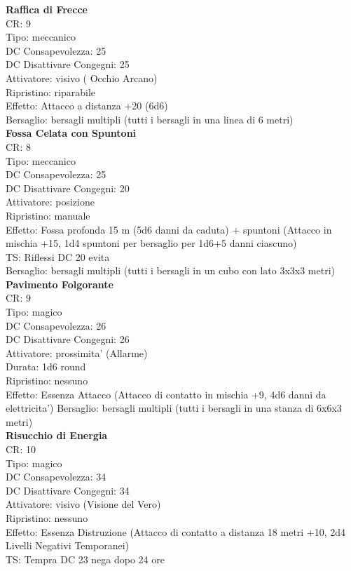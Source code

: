 \documentclass[a4paper,11pt,twoside,openany]{book}
\begin{document}
{\begin{multicols}{2}
			\textbf{Raffica di Frecce}\\
			CR: 9 \\
			Tipo: meccanico \\
			DC Consapevolezza: 25 \\
			DC Disattivare Congegni: 25 \\
			Attivatore: visivo ( Occhio Arcano) \\
			Ripristino: riparabile \\
			Effetto: Attacco a distanza +20 (6d6) \\
			Bersaglio: bersagli multipli (tutti i bersagli in una linea di 6 metri)\\
			
			\textbf{Fossa Celata con Spuntoni}\\
			CR: 8 \\
			Tipo: meccanico \\
			DC Consapevolezza: 25 \\
			DC Disattivare Congegni: 20 \\
			Attivatore: posizione \\
			Ripristino: manuale \\
			Effetto: Fossa profonda 15 m (5d6 danni da caduta) + spuntoni (Attacco in mischia +15, 1d4 spuntoni per bersaglio per 1d6+5 danni ciascuno) \\
			TS: Riflessi DC 20 evita \\
			Bersaglio: bersagli multipli (tutti i bersagli in un cubo con lato 3x3x3 metri)\\
			
			\textbf{Pavimento Folgorante}\\
			CR: 9 \\
			Tipo: magico \\
			DC Consapevolezza: 26 \\
			DC Disattivare Congegni: 26 \\
			Attivatore: prossimita' (Allarme) \\
			Durata: 1d6 round \\
			Ripristino: nessuno \\
			Effetto: Essenza Attacco (Attacco di contatto in mischia +9, 4d6 danni da elettricita') 
			Bersaglio: bersagli multipli (tutti i bersagli in una stanza di 6x6x3 metri)\\
			
			\textbf{Risucchio di Energia}\\
			CR: 10 \\
			Tipo: magico \\
			DC Consapevolezza: 34 \\
			DC Disattivare Congegni: 34 \\
			Attivatore: visivo (Visione del Vero) \\
			Ripristino: nessuno \\
			Effetto: Essenza Distruzione (Attacco di contatto a distanza 18 metri +10, 2d4 Livelli Negativi Temporanei) \\
			TS: Tempra DC 23 nega dopo 24 ore\\
			

\end{multicols}}
\end{document}
